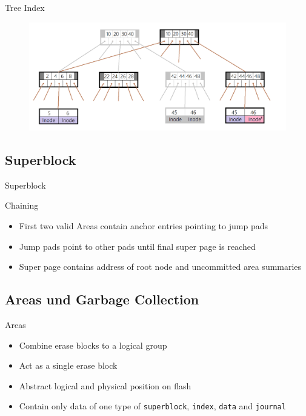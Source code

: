 \documentclass[
	,footlinenumber
	,navline=true
	,footlineauthor
	,ngerman
	]{beamer}
\begin{document}
\begin{frame}{Tree Index}
	\begin{figure}[H]
		\centering
		\includegraphics[width=\textwidth]{../images/btree_2.png}
	\end{figure}
\end{frame}

\subsection{Superblock}
\begin{frame}{Superblock}
	\begin{block}{Chaining}
		\begin{itemize}
			\item First two valid Areas contain anchor entries pointing to jump pads
			\item Jump pads point to other pads until final super page is reached
			\item Super page contains address of root node and uncommitted area summaries
		\end{itemize}
	\end{block}
\end{frame}

\subsection{Areas und Garbage Collection}
\begin{frame}{Areas}
	\begin{block}{}
		\begin{itemize}
			\item Combine erase blocks to a logical group
			\item Act as a single erase block
			\item Abstract logical and physical position on flash
			\item Contain only data of one type of \texttt{superblock}, \texttt{index}, \texttt{data} and \texttt{journal}
		\end{itemize}
	\end{block}
\end{frame}
\end{document}
